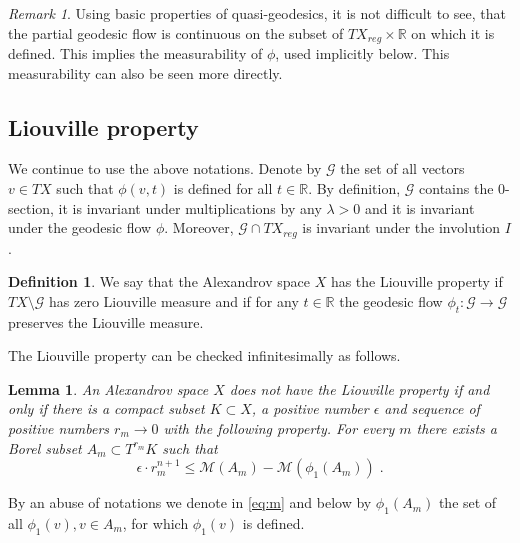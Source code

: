 \documentclass[12pt,leqno]{amsart}
\numberwithin{equation}{section}
\newtheorem{lem}[thm]{Lemma}
\theoremstyle{definition}
\newtheorem{defn}[thm]{Definition}%
\theoremstyle{remark}
\newtheorem{rem}[thm]{Remark}
\newcommand{\R}{\mathbb{R}}
\def\:{\colon}
\begin{document}
\begin{rem}  Using basic properties of quasi-geodesics, it is not difficult  to see,  that the partial  geodesic
flow  is continuous  on the subset  of $TX_{reg}\times \R$ on which it is defined. This implies the measurability of $\mathcal \phi$, used implicitly below. 
This measurability can also be seen more directly.
\end{rem}



\subsection{Liouville property}
We continue to use the above notations.
 Denote by $\mathcal G$ the set of all vectors $v\in TX $ such that $\phi (v,t)$ is defined for all $t\in \R$. By definition, $\mathcal G$ contains the $0$-section, it
 is invariant under multiplications by any $\lambda >0$  and it is invariant under the geodesic flow $\phi$. Moreover, $\mathcal G\cap TX_{reg}$ is invariant under the involution $I$.
  \begin{defn}
 We say that the Alexandrov space $X$ has the Liouville property if  $TX\setminus \mathcal G$ has zero Liouville measure  and if
for any $t\in \R$ the geodesic flow $\phi _t \:\mathcal G\to \mathcal G$ preserves the Liouville measure.
 \end{defn}

The Liouville property can be checked infinitesimally as follows.

\begin{lem} \label{infini}
An Alexandrov space $X$ does not have the Liouville property if and only if there is a compact subset $K\subset X$, a positive number
$\epsilon$ and sequence of positive numbers  $r_m \to 0$  with the following property.
 For every  $m$ there exists a Borel subset $A_m\subset T^{r_ m} K$ such that
 \begin{equation} \label{eq:m}
\epsilon \cdot r_m^{n +1} \leq \mathcal M (A_m) -\mathcal M (\phi _1 (A_m)) \;.
\end{equation}
\end{lem}
By an abuse of notations we denote in \eqref{eq:m}  and below by  $\phi_1 (A_m)$ the set of all $\phi _1(v), v\in A_m$, for which
$\phi _1(v)$ is defined.
\end{document}

